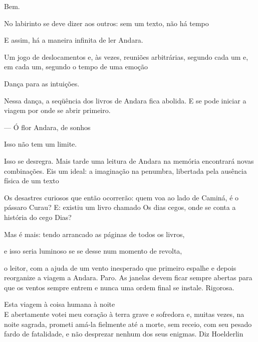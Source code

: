 \pagebreak

\vspace*{4cm}

Bem.

No labirinto se deve dizer aos outros: sem um texto, não há tempo

E assim, há a maneira infinita de ler Andara.

Um jogo de deslocamentos e, às vezes, reuniões arbitrárias, segundo cada
um e, em cada um, segundo o tempo de uma emoção

Dança para as intuições.

\pagebreak

\vspace*{4cm}

Nessa dança, a seqüência dos livros de Andara fica abolida. E se pode
iniciar a viagem por onde se abrir primeiro.

--- Ó flor Andara, de sonhos

Isso não tem um limite.

Isso se desregra. Mais tarde uma leitura de Andara na memória encontrará
novas combinações. Eis um ideal: a imaginação na penumbra, libertada
pela ausência física de um texto

Os desastres curiosos que então ocorrerão: quem voa ao lado de Caminá, é
o pássaro Curau? E: existiu um livro chamado Os dias cegos, onde se
conta a história do cego Dias?

Mas é mais: tendo arrancado as páginas de todos os livros,

e isso seria luminoso se se desse num momento de revolta,

o leitor, com a ajuda de um vento inesperado que primeiro espalhe e
depois reorganize a viagem a Andara. Paro. As janelas devem ficar sempre
abertas para que os ventos sempre entrem e nunca uma ordem final se
instale. Rigorosa.

\pagebreak

\clearpage
\thispagestyle{empty}

\movetooddpage

\vspace*{4cm}

Esta viagem à coisa humana à noite\\

E abertamente votei meu coração à terra grave e sofredora e, muitas
vezes, na noite sagrada, prometi amá-la fielmente até a morte, sem
receio, com seu pesado fardo de fatalidade, e não desprezar nenhum dos
seus enigmas. Diz Hoelderlin

